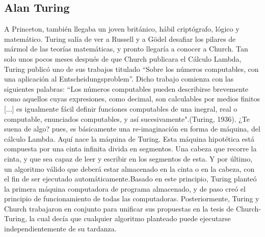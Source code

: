 \documentclass[12pt]{article}
\begin{document}
\begin{multicols}{2}
\section*{Alan Turing}
\cite{Cop} A Princeton, también llegaba un joven británico, hábil criptógrafo, lógico y matemático. Turing salía de ver a Russell y a Gödel desafiar los pilares de mármol de las teorías matemáticas, y pronto llegaría a conocer a Church. Tan solo unos pocos meses después de que Church publicara el Cálculo Lambda, Turing publicó uno de sus trabajos titulado “Sobre los números computables, con una aplicación al Entscheidungsproblem”. Dicho trabajo comienza con las siguientes palabras:\cite{Tur} “Los números computables pueden describirse brevemente como aquellos cuyas expresiones, como decimal, son calculables por medios finitos [...] es igualmente fácil definir funciones computables de una inegral, real o computable, enunciados computables, y así sucesivamente".(Turing, 1936). ¿Te suena de algo? pues, es básicamente una re-imaginación en forma de máquina, del cálculo Lambda. Aquí nace la máquina de Turing.\cite{Cop} Esta máquina hipotética está compuesta por una cinta infinita divida en segmentos. Una cabeza que recorre la cinta, y que sea capaz de leer y escribir en los segmentos de esta. Y por último, un algoritmo válido que deberá estar almacenado en la cinta o en la cabeza, con el fin de ser ejecutado automáticamente.Basado en este principio, Turing planteó la primera máquina computadora de programa almacenado, y de paso creó el principio de funcionamiento de todas las computadoras. Posteriormente, Turing y Church trabajaron en conjunto para unificar sus propuestas en la tesis de Church-Turing, la cual decía que cualquier algoritmo planteado puede ejecutarse independientemente de su tardanza. 

\end{multicols}
\end{document}
